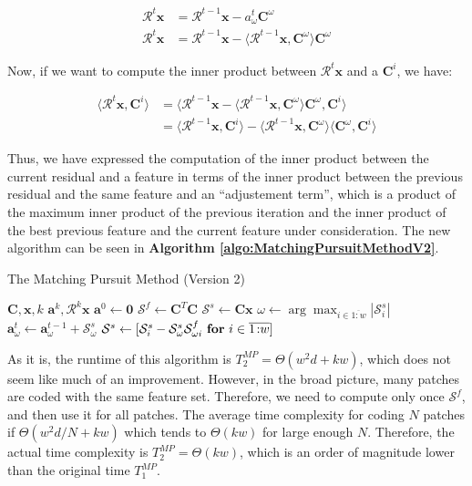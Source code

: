 \documentclass[12pt,a4paper,oneside,english]{UPBThesis}
\newcommand{\hcrange}[2]{\overline{{#1}\colon\!\!{#2}}}
\begin{document}
\begin{align*}
\mathcal{R}^t\textbf{x} & = \mathcal{R}^{t-1}\textbf{x} - a_\omega^t\textbf{C}^\omega \\
\mathcal{R}^t\textbf{x} & = \mathcal{R}^{t-1}\textbf{x} - \langle \mathcal{R}^{t-1}\textbf{x}, \textbf{C}^\omega \rangle \textbf{C}^\omega
\end{align*}

Now, if we want to compute the inner product between $\mathcal{R}^t\textbf{x}$ and a $\textbf{C}^i$, we have:

\begin{align*}
\langle \mathcal{R}^t\textbf{x}, \textbf{C}^i \rangle & = \langle \mathcal{R}^{t-1}\textbf{x} - \langle \mathcal{R}^{t-1}\textbf{x}, \textbf{C}^\omega \rangle \textbf{C}^\omega , \textbf{C}^i \rangle \\
& = \langle \mathcal{R}^{t-1}\textbf{x}, \textbf{C}^i \rangle - \langle \mathcal{R}^{t-1}\textbf{x}, \textbf{C}^\omega \rangle \langle \textbf{C}^\omega, \textbf{C}^i \rangle
\end{align*}

Thus, we have expressed the computation of the inner product between the current residual and a feature in terms of the inner product between the previous residual and the same feature and an ``adjustement term'', which is a product of the maximum inner product of the previous iteration and the inner product of the best previous feature and the current feature under consideration. The new algorithm can be seen in \textbf{Algorithm \ref{algo:MatchingPursuitMethodV2}}.

\begin{algorithm}
\caption{The Matching Pursuit Method (Version 2)}
\label{algo:MatchingPursuitMethodV2}
\begin{algorithmic}
\Require $\textbf{C},\textbf{x},k$
\Ensure $\textbf{a}^k,\mathcal{R}^k\textbf{x}$
\State $\textbf{a}^0 \gets \textbf{0}$
\State $\mathcal{S}^f \gets \textbf{C}^T\textbf{C}$
\State $\mathcal{S}^s \gets \textbf{C}\textbf{x}$
\For {$t = \hcrange{1}{k}$}
\State $\omega \gets \arg \max_{i \in \hcrange{1}{w}} \left| \mathcal{S}_i^s \right|$
\State $\textbf{a}_\omega^t \gets \textbf{a}_\omega^{t-1} + \mathcal{S}_\omega^s$
\State $\mathcal{S}^s \gets [ \mathcal{S}_i^s - \mathcal{S}_\omega^s \mathcal{S}_{\omega i}^f ~ \mbox{\textbf{for} $i \in \hcrange{1}{w}$} ]$
\EndFor
\end{algorithmic}
\end{algorithm}

As it is, the runtime of this algorithm is $T_2^{MP} = \Theta(w^2d + kw)$, which does not seem like much of an improvement. However, in the broad picture, many patches are coded with the same feature set. Therefore, we need to compute only once $\mathcal{S}^f$, and then use it for all patches. The average time complexity for coding $N$ patches if $\Theta(w^2d/N + kw)$ which tends to $\Theta(kw)$ for large enough $N$. Therefore, the actual time complexity is $T_2^{MP} = \Theta(kw)$, which is an order of magnitude lower than the original time $T_1^{MP}$.
\end{document}
